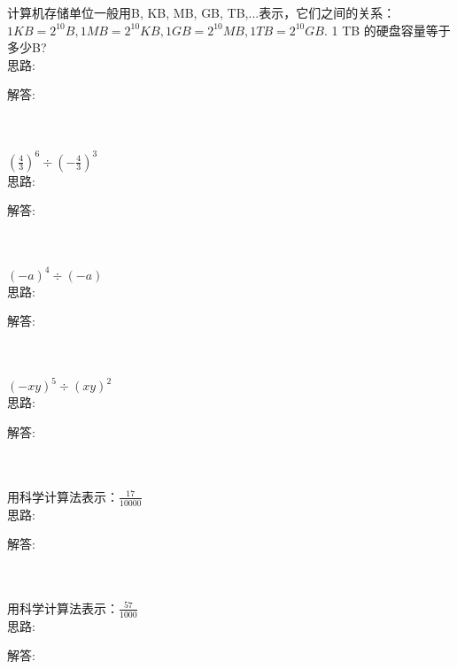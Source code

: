 \item {
    计算机存储单位一般用B, KB, MB, GB, TB,...表示，它们之间的关系：$1 KB = 2^{10} B, 1 MB = 2^{10} KB, 1 GB = 2^{10} MB, 1 TB = 2^{10} GB.$ 1 TB 的硬盘容量等于多少B?
    \ifshowSolution
        \fangsong{}
        \\
        思路:

        解答: 
    \else
        \\ \\ \\
    \fi
}

\item {
    $ (\frac{4}{3})^{6}\div (-\frac{4}{3})^{3} $
    \ifshowSolution
        \fangsong{}
        \\
        思路:

        解答: 
    \else
        \\ \\ \\
    \fi
}

\item {
    $ (-a)^{4}\div (-a) $
    \ifshowSolution
        \fangsong{}
        \\
        思路:

        解答: 
    \else
        \\ \\ \\
    \fi
}

\item {
    $ (-xy)^{5}\div (xy)^{2} $
    \ifshowSolution
        \fangsong{}
        \\
        思路:

        解答: 
    \else
        \\ \\ \\
    \fi
}

\item {
    用科学计算法表示：$ \frac{17}{10000} $
    \ifshowSolution
        \fangsong{}
        \\
        思路:

        解答: 
    \else
        \\ \\ \\
    \fi
}

\item {
    用科学计算法表示：$ \frac{57}{1000} $
    \ifshowSolution
        \fangsong{}
        \\
        思路:

        解答: 
    \else
        \\ \\ \\
    \fi
}

